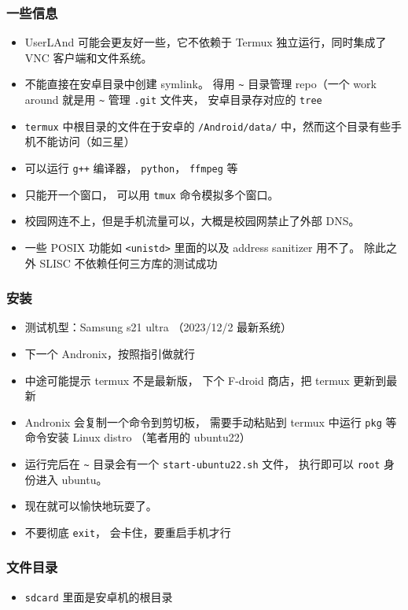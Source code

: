 

\begin{issues}
\issueDraft
\end{issues}

\subsubsection{一些信息}
\begin{itemize}
\item UserLAnd 可能会更友好一些，它不依赖于 Termux 独立运行，同时集成了 VNC 客户端和文件系统。
\item 不能直接在安卓目录中创建 symlink。 得用 \verb`~` 目录管理 repo（一个 work around 就是用 \verb`~` 管理 \verb`.git` 文件夹， 安卓目录存对应的 \verb`tree`
\item \verb`termux` 中根目录的文件在于安卓的 \verb`/Android/data/` 中，然而这个目录有些手机不能访问（如三星）
\item 可以运行 \verb`g++` 编译器， \verb`python`， \verb`ffmpeg` 等
\item 只能开一个窗口， 可以用 \verb`tmux` 命令模拟多个窗口。
\item 校园网连不上，但是手机流量可以，大概是校园网禁止了外部 DNS。
\item 一些 POSIX 功能如 \verb`<unistd>` 里面的以及 address sanitizer 用不了。 除此之外 SLISC 不依赖任何三方库的测试成功
\end{itemize}

\subsubsection{安装}
\begin{itemize}
\item 测试机型：Samsung s21 ultra （2023/12/2 最新系统）
\item 下一个 Andronix，按照指引做就行
\item 中途可能提示 termux 不是最新版， 下个 F-droid 商店，把 termux 更新到最新
\item Andronix 会复制一个命令到剪切板， 需要手动粘贴到 termux 中运行 \verb`pkg` 等命令安装 Linux distro （笔者用的 ubuntu22）
\item 运行完后在 \verb`~` 目录会有一个 \verb`start-ubuntu22.sh` 文件， 执行即可以 \verb`root` 身份进入 ubuntu。
\item 现在就可以愉快地玩耍了。
\item 不要彻底 \verb`exit`， 会卡住，要重启手机才行
\end{itemize}

\subsubsection{文件目录}
\begin{itemize}
\item \verb`sdcard` 里面是安卓机的根目录
\end{itemize}
